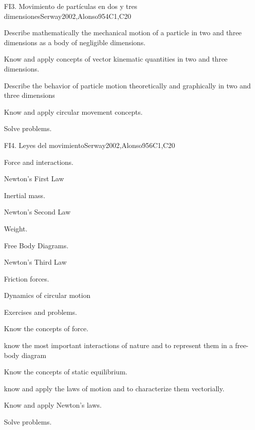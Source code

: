 \begin{syllabus}
\begin{unit}{FI3. Movimiento de partículas en dos y tres dimensiones}{}{Serway2002,Alonso95}{4}{C1,C20}
   \begin{learningoutcomes}
      \item Describe mathematically the mechanical motion of a particle in two and three dimensions as a body of negligible dimensions.
      \item Know and apply concepts of vector kinematic quantities in two and three dimensions.
      \item Describe the behavior of particle motion theoretically and graphically in two and three dimensions
      \item Know and apply circular movement concepts.
      \item Solve problems.
   \end{learningoutcomes}
\end{unit}

\begin{unit}{FI4. Leyes del movimiento}{}{Serway2002,Alonso95}{6}{C1,C20}
\begin{topics}
      \item Force and interactions.
      \item Newton's First Law
      \item Inertial mass.
      \item Newton's Second Law
      \item Weight.
      \item Free Body Diagrams.
      \item Newton's Third Law
      \item Friction forces.
      \item Dynamics of circular motion
      \item Exercises and problems.
   \end{topics}

   \begin{learningoutcomes}
      \item Know the concepts of force.
      \item know the most important interactions of nature and to represent them in a free-body diagram
      \item Know the concepts of static equilibrium.
      \item know and apply the laws of motion and to characterize them vectorially.
      \item Know and apply Newton's laws.
      \item Solve problems.
   \end{learningoutcomes}
\end{unit}


\end{syllabus}
